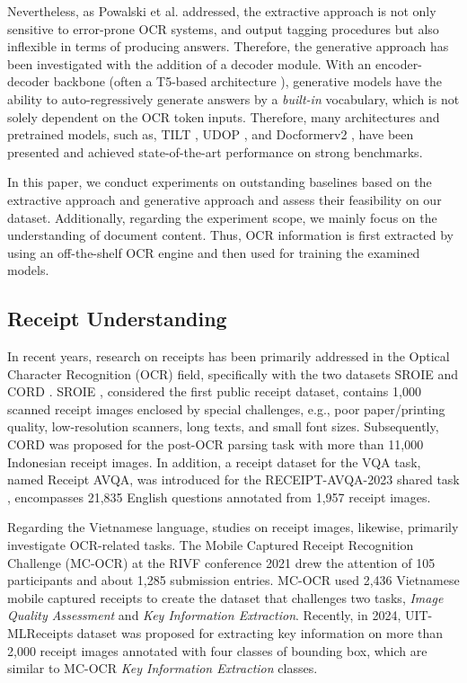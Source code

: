 Nevertheless, as Powalski et al. \cite{tilt} addressed, the extractive approach is not only sensitive to error-prone OCR systems, and output tagging procedures but also inflexible in terms of producing answers. Therefore, the generative approach has been investigated with the addition of a decoder module. With an encoder-decoder backbone (often a T5-based architecture \cite{t5model}), generative models have the ability to auto-regressively generate answers by a \textit{built-in} vocabulary, which is not solely dependent on the OCR token inputs. Therefore, many architectures and pretrained models, such as, TILT \cite{tilt}, UDOP \cite{udop}, and Docformerv2 \cite{docformerv2}, have been presented and achieved state-of-the-art performance on strong benchmarks.

In this paper, we conduct experiments on outstanding baselines based on the extractive approach and generative approach and assess their feasibility on our dataset. Additionally, regarding the experiment scope, we mainly focus on the understanding of document content. Thus, OCR information is first extracted by using an off-the-shelf OCR engine and then used for training the examined models.


\subsection{Receipt Understanding} \label{sec:rel_ru}

In recent years, research on receipts has been primarily addressed in the Optical Character Recognition (OCR) field, specifically with the two datasets SROIE \cite{huang2019sroie} and CORD \cite{park2019cord}. SROIE \cite{huang2019sroie}, considered the first public receipt dataset, contains 1,000 scanned receipt images enclosed by special challenges, e.g., poor paper/printing quality, low-resolution scanners, long texts, and small font sizes. Subsequently, CORD \cite{park2019cord} was proposed for the post-OCR parsing task with more than 11,000 Indonesian receipt images. In addition, a receipt dataset for the VQA task, named Receipt AVQA, was introduced for the RECEIPT-AVQA-2023 shared task \cite{ravqa}, encompasses 21,835 English questions annotated from 1,957 receipt images.

Regarding the Vietnamese language, studies on receipt images, likewise, primarily investigate OCR-related tasks. The Mobile Captured Receipt Recognition Challenge (MC-OCR) \cite{mcocr} at the RIVF conference 2021 drew the attention of 105 participants and about 1,285 submission entries. MC-OCR used 2,436 Vietnamese mobile captured receipts to create the dataset that challenges two tasks, \textit{Image Quality Assessment} and \textit{Key Information Extraction}. Recently, in 2024, UIT-MLReceipts dataset was proposed for extracting key information on more than 2,000 receipt images annotated with four classes of bounding box, which are similar to MC-OCR \textit{Key Information Extraction} classes.

